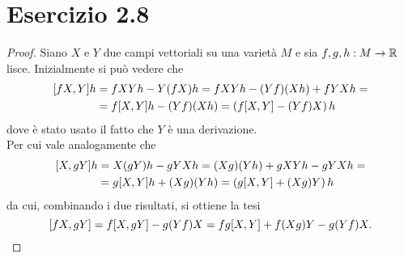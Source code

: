 \documentclass[italian,a4paper,11pt]{article}
\begin{document}
\section*{Esercizio 2.8}
\begin{proof}
Siano $X$ e $Y$ due campi vettoriali su una varietà $M$ e sia $f,g,h:M \rightarrow \mathbb R$ lisce. Inizialmente si può vedere che
\begin{align*}
\comm{fX}{Y}h &= fXYh - Y(fX)h = fXYh - (Yf)(Xh) + fYXh =\\
&= f\comm{X}{Y}h - (Yf)(Xh) = \left( f\comm{X}{Y} - (Yf)X\right)h
\end{align*}
dove è stato usato il fatto che $Y$ è una derivazione.\\
Per cui vale analogamente che 
\begin{align*}
\comm{X}{gY}h &= X(gY)h - gYXh = (Xg)(Yh) + gXYh - gYXh = \\
&= g\comm{X}{Y}h + (Xg)(Yh) = \left( g\comm{X}{Y} + (Xg)Y\right)h
\end{align*} 
da cui, combinando i due risultati, si ottiene la tesi
\begin{equation*}
\comm{fX}{gY} = f\comm{X}{gY} - g(Yf)X = fg\comm{X}{Y} + f(Xg)Y - g(Yf)X.
\end{equation*}
\end{proof}
\end{document}
